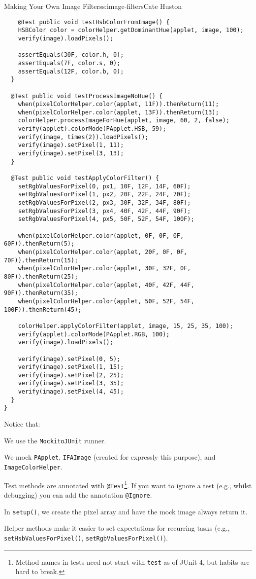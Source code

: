 \begin{aosachapter}{Making Your Own Image Filters}{s:image-filters}{Cate Huston}
\begin{verbatim}
    @Test public void testHsbColorFromImage() {
    HSBColor color = colorHelper.getDominantHue(applet, image, 100);
    verify(image).loadPixels();

    assertEquals(30F, color.h, 0);
    assertEquals(7F, color.s, 0);
    assertEquals(12F, color.b, 0);
  }

  @Test public void testProcessImageNoHue() {
    when(pixelColorHelper.color(applet, 11F)).thenReturn(11);
    when(pixelColorHelper.color(applet, 13F)).thenReturn(13);
    colorHelper.processImageForHue(applet, image, 60, 2, false);
    verify(applet).colorMode(PApplet.HSB, 59);
    verify(image, times(2)).loadPixels();
    verify(image).setPixel(1, 11);
    verify(image).setPixel(3, 13);
  }

  @Test public void testApplyColorFilter() {
    setRgbValuesForPixel(0, px1, 10F, 12F, 14F, 60F);
    setRgbValuesForPixel(1, px2, 20F, 22F, 24F, 70F);
    setRgbValuesForPixel(2, px3, 30F, 32F, 34F, 80F);
    setRgbValuesForPixel(3, px4, 40F, 42F, 44F, 90F);
    setRgbValuesForPixel(4, px5, 50F, 52F, 54F, 100F);

    when(pixelColorHelper.color(applet, 0F, 0F, 0F, 60F)).thenReturn(5);
    when(pixelColorHelper.color(applet, 20F, 0F, 0F, 70F)).thenReturn(15);
    when(pixelColorHelper.color(applet, 30F, 32F, 0F, 80F)).thenReturn(25);
    when(pixelColorHelper.color(applet, 40F, 42F, 44F, 90F)).thenReturn(35);
    when(pixelColorHelper.color(applet, 50F, 52F, 54F, 100F)).thenReturn(45);

    colorHelper.applyColorFilter(applet, image, 15, 25, 35, 100);
    verify(applet).colorMode(PApplet.RGB, 100);
    verify(image).loadPixels();

    verify(image).setPixel(0, 5);
    verify(image).setPixel(1, 15);
    verify(image).setPixel(2, 25);
    verify(image).setPixel(3, 35);
    verify(image).setPixel(4, 45);
  }
}
\end{verbatim}

Notice that:

\begin{aosaitemize}

\item
  We use the \texttt{MockitoJUnit} runner.
\item
  We mock \texttt{PApplet}, \texttt{IFAImage} (created for expressly
  this purpose), and \texttt{ImageColorHelper}.
\item
  Test methods are annotated with \texttt{@Test}\footnote{Method names
    in tests need not start with \texttt{test} as of JUnit 4, but habits
    are hard to break.}. If you want to ignore a test (e.g., whilst
  debugging) you can add the annotation \texttt{@Ignore}.
\item
  In \texttt{setup()}, we create the pixel array and have the mock image
  always return it.
\item
  Helper methods make it easier to set expectations for recurring tasks
  (e.g., \texttt{setHsbValuesForPixel()},
  \texttt{setRgbValuesForPixel()}).
\end{aosaitemize}


\end{aosachapter}
